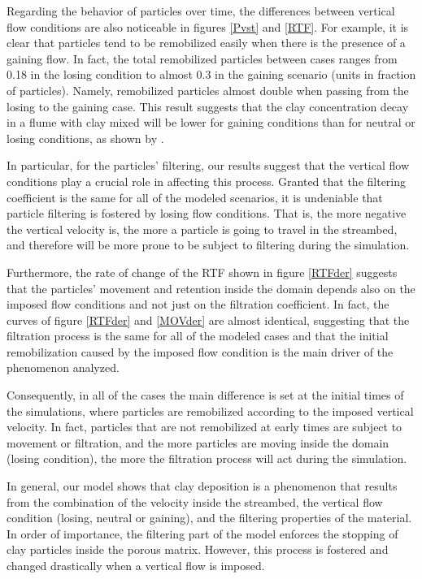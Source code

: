 \documentclass[draft,linenumbers]{agujournal2018}
\begin{document}
Regarding the behavior of particles over time, the differences between vertical flow conditions are also noticeable in figures \ref{Pvst} and \ref{RTF}. For example, it is clear that particles tend to be remobilized easily when there is the presence of a gaining flow. In fact, the total remobilized particles between cases ranges from 0.18 in the losing condition to almost 0.3 in the gaining scenario (units in fraction of particles). Namely, remobilized particles almost double when passing from the losing to the gaining case. This result suggests that the clay concentration decay in a flume with clay mixed will be lower for gaining conditions than for neutral or losing conditions, as shown by \citet{Fox2018}.

In particular, for the particles' filtering, our results suggest that the vertical flow conditions play a crucial role in affecting this process. Granted that the filtering coefficient is the same for all of the modeled scenarios, it is undeniable that particle filtering is fostered by losing flow conditions. That is, the more negative the vertical velocity is, the more a particle is going to travel in the streambed, and therefore will be more prone to be subject to filtering during the simulation. 

Furthermore, the rate of change of the RTF shown in figure \ref{RTFder} suggests that the particles' movement and retention inside the domain depends also on the imposed flow conditions and not just on the filtration coefficient. In fact, the curves of figure \ref{RTFder} and \ref{MOVder} are almost identical, suggesting that the filtration process is the same for all of the modeled cases and that the initial remobilization caused by the imposed flow condition is the main driver of the phenomenon analyzed. 

Consequently, in all of the cases the main difference is set at the initial times of the simulations, where particles are remobilized according to the imposed vertical velocity. In fact, particles that are not remobilized at early times are subject to movement or filtration, and the more particles are moving inside the domain (losing condition), the more the filtration process will act during the simulation. 

In general, our model shows that clay deposition is a phenomenon that results from the combination of the velocity inside the streambed, the vertical flow condition (losing, neutral or gaining), and the filtering properties of the material. In order of importance, the filtering part of the model enforces the stopping of clay particles inside the porous matrix. However, this process is fostered and changed drastically when a vertical flow is imposed. 
\end{document}
